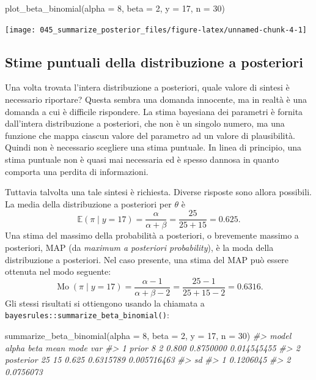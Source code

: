 \documentclass[
  11pt,
  italian,
  a4paper,
  extrafontsizes,onecolumn,openright
  ]{memoir}
\newenvironment{Shaded}{\begin{snugshade}}{\end{snugshade}}
\newcommand{\AttributeTok}[1]{\textcolor[rgb]{0.77,0.63,0.00}{#1}}
\newcommand{\CommentTok}[1]{\textcolor[rgb]{0.56,0.35,0.01}{\textit{#1}}}
\newcommand{\DecValTok}[1]{\textcolor[rgb]{0.00,0.00,0.81}{#1}}
\newcommand{\FunctionTok}[1]{\textcolor[rgb]{0.00,0.00,0.00}{#1}}
\newcommand{\NormalTok}[1]{#1}
\DeclareMathOperator{\Mo}{Mo} %
\newcommand{\E}{\mathbb{E}} %
\begin{document}
\begin{Shaded}
\begin{Highlighting}[]
\FunctionTok{plot\_beta\_binomial}\NormalTok{(}\AttributeTok{alpha =} \DecValTok{8}\NormalTok{, }\AttributeTok{beta =} \DecValTok{2}\NormalTok{, }\AttributeTok{y =} \DecValTok{17}\NormalTok{, }\AttributeTok{n =} \DecValTok{30}\NormalTok{)}
\end{Highlighting}
\end{Shaded}

\begin{center}\texttt{[image: 045\_summarize\_posterior\_files/figure-latex/unnamed-chunk-4-1]} \end{center}

\hypertarget{stime-puntuali-della-distribuzione-a-posteriori}{%
\subsection{Stime puntuali della distribuzione a posteriori}\label{stime-puntuali-della-distribuzione-a-posteriori}}

Una volta trovata l'intera distribuzione a posteriori, quale valore di
sintesi è necessario riportare? Questa sembra una domanda innocente, ma
in realtà è una domanda a cui è difficile rispondere. La stima bayesiana dei parametri è fornita dall'intera distribuzione a posteriori, che non è un singolo numero, ma una funzione che mappa ciascun valore del parametro ad un valore di plausibilità. Quindi non è necessario scegliere una stima puntuale. In linea di principio, una stima puntuale non è quasi mai necessaria ed è spesso dannosa in quanto comporta una perdita di informazioni.

Tuttavia talvolta una tale sintesi è richiesta. Diverse risposte sono allora possibili. La media della distribuzione a posteriori per \(\theta\) è
\[
\E(\pi \mid y = 17) = \frac{\alpha}{\alpha + \beta} = \frac{25}{25+15} = 0.625.
\]
Una stima del massimo della probabilità a posteriori, o brevemente massimo a posteriori, MAP (da \emph{maximum a posteriori probability}), è la moda della distribuzione a posteriori. Nel caso presente, una stima del MAP può essere ottenuta nel modo seguente:
\[
\Mo(\pi \mid y = 17) = \frac{\alpha-1}{\alpha + \beta-2} = \frac{25-1}{25+15-2} = 0.6316.
\]
Gli stessi risultati si ottiengono usando la chiamata a \texttt{bayesrules::summarize\_beta\_binomial()}:

\begin{Shaded}
\begin{Highlighting}[]
\FunctionTok{summarize\_beta\_binomial}\NormalTok{(}\AttributeTok{alpha =} \DecValTok{8}\NormalTok{, }\AttributeTok{beta =} \DecValTok{2}\NormalTok{, }\AttributeTok{y =} \DecValTok{17}\NormalTok{, }\AttributeTok{n =} \DecValTok{30}\NormalTok{)}
\CommentTok{\#\textgreater{}       model alpha beta  mean      mode         var}
\CommentTok{\#\textgreater{} 1     prior     8    2 0.800 0.8750000 0.014545455}
\CommentTok{\#\textgreater{} 2 posterior    25   15 0.625 0.6315789 0.005716463}
\CommentTok{\#\textgreater{}          sd}
\CommentTok{\#\textgreater{} 1 0.1206045}
\CommentTok{\#\textgreater{} 2 0.0756073}
\end{Highlighting}
\end{Shaded}
\end{document}
